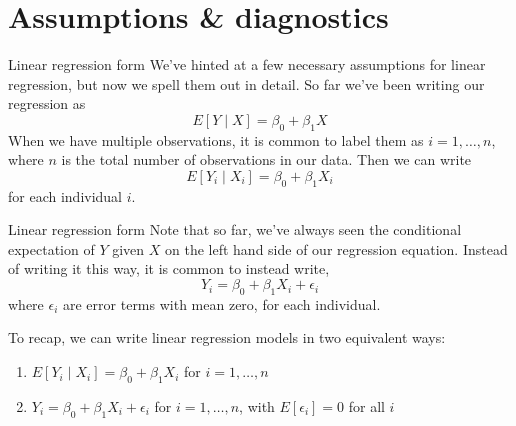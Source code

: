\documentclass[10pt,t]{beamer}
\begin{document}
\section{Assumptions \& diagnostics}

\begin{frame}{Linear regression form}
We've hinted at a few necessary assumptions for linear regression, but now we spell them out in detail. So far we've been writing our regression as
$$
E[Y \mid X] = \beta_0 + \beta_1 X
$$
When we have multiple observations, it is common to label them as $i = 1, \dots, n$, where $n$ is the total number of observations in our data. Then we can write
$$
E[Y_i \mid X_i] = \beta_0 + \beta_1 X_i
$$
for each individual $i$. 
\end{frame}

\begin{frame}{Linear regression form}
Note that so far, we've always seen the conditional expectation of $Y$ given $X$ on the left hand side of our regression equation. Instead of writing it this way, it is common to instead write,
$$
Y_i = \beta_0 + \beta_1 X_i + \epsilon_i
$$
where $\epsilon_i$ are error terms with mean zero, for each individual. 

\vspace{0.3cm}

To recap, we can write linear regression models in two equivalent ways:
\begin{enumerate}
	\item $E[Y_i \mid X_i] = \beta_0 + \beta_1 X_i$ for $i = 1, \dots, n$
	\item $Y_i = \beta_0 + \beta_1 X_i + \epsilon_i$ for $i = 1, \dots, n$, with $E[\epsilon_i] = 0$ for all $i$
\end{enumerate}

\end{frame}
\end{document}
